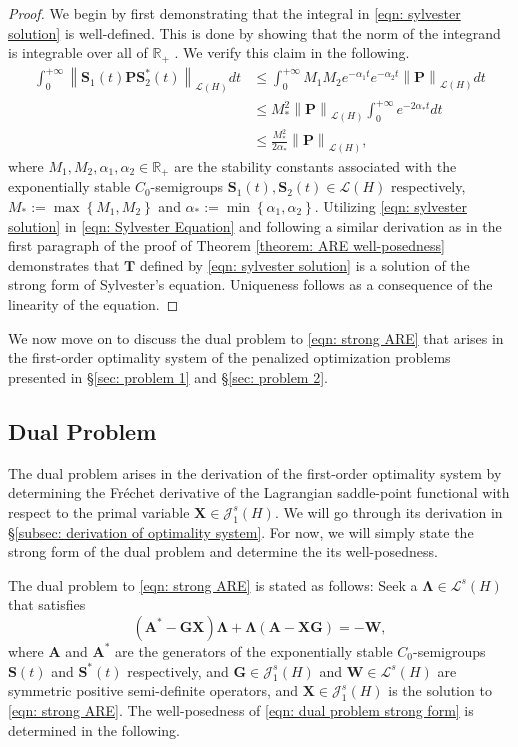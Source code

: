 \documentclass{amsart}
\newcommand{\sL}{\mathscr L}
\newcommand{\sJ}{\mathscr J}
\newcommand{\p}[1]{\left( {#1} \right)}
\newcommand{\norm}[1]{\left\| #1 \right\|}
\newcommand{\Br}[1]{\left\{ #1 \right\}}
\newcommand{\bA}{\mathbf A}
\newcommand{\bX}{\mathbf X}
\newcommand{\bG}{\mathbf G}
\newcommand{\bS}{\mathbf S}
\newcommand{\bLambda}{\boldsymbol{\Lambda}}
\newcommand{\bW}{\mathbf W}
\begin{document}
\begin{proof}
    We begin by first demonstrating that the integral in \eqref{eqn: sylvester solution} is well-defined. This is done by showing that the norm of the integrand is integrable over all of $\mathbb R_+$ \cite[Section 2, Theorem 2]{diestel1974vector}. We verify this claim in the following.
    $$
    \begin{aligned}
        \int_0^{+\infty} \norm{\bS_1(t) \mathbf P \bS_2^*(t)}_{\sL\p{H}}dt 
        &\leq \int_0^{+\infty} M_1 M_2 e^{-\alpha_1 t} e^{-\alpha_2 t} \norm{\mathbf P}_{\sL\p{H}} dt \\
        &\leq M_*^2 \norm{\mathbf P}_{\sL\p{H}}  \int_0^{+\infty} e^{-2\alpha_* t} dt \\
        &\leq \frac{M_*^2 }{2\alpha_*} \norm{\mathbf P}_{\sL\p{H}},
    \end{aligned}
    $$
    where $M_1, M_2, \alpha_1, \alpha_2 \in \mathbb R_+$ are the stability constants associated with the exponentially stable $C_0$-semigroups $\bS_1(t), \bS_2(t) \in \sL\p{H}$ respectively, $M_* := \max\Br{M_1, M_2}$ and $\alpha_* := \min \Br{\alpha_1, \alpha_2}$. Utilizing \eqref{eqn: sylvester solution} in \eqref{eqn: Sylvester Equation} and following a similar derivation as in the first paragraph of the proof of Theorem \ref{theorem: ARE well-posedness} demonstrates that $\mathbf T$ defined by \eqref{eqn: sylvester solution} is a solution of the strong form of Sylvester's equation. Uniqueness follows as a consequence of the linearity of the equation.  
\end{proof}

We now move on to discuss the dual problem to \eqref{eqn: strong ARE} that arises in the first-order optimality system of the penalized optimization problems presented in \S\ref{sec: problem 1} and \S \ref{sec: problem 2}.

\subsection{Dual Problem}
The dual problem arises in the derivation of the first-order optimality system by determining the Fr\'echet derivative of the Lagrangian saddle-point functional with respect to the primal variable $\bX\in\sJ_1^s(H)$. We will go through its derivation in \S\ref{subsec: derivation of optimality system}. For now, we will simply state the strong form of the dual problem and determine the its well-posedness. 

The dual problem to \eqref{eqn: strong ARE} is stated as follows: Seek a $\bLambda\in\sL^s(H)$ that satisfies
\begin{equation} \label{eqn: dual problem strong form}
    \p{\bA^* - \bG\bX}\bLambda + \bLambda\p{\bA-\bX\bG} = -\bW,
\end{equation}
where $\bA$ and $\bA^*$ are the generators of the exponentially stable $C_0$-semigroups $\bS(t)$ and $\bS^*(t)$ respectively, and $\bG \in \sJ_1^s(H)$ and $\bW \in \sL^s(H)$ are symmetric positive semi-definite operators, and $\bX\in \sJ_1^s(H)$ is the solution to \eqref{eqn: strong ARE}. The well-posedness of \eqref{eqn: dual problem strong form} is determined in the following.
\end{document}
